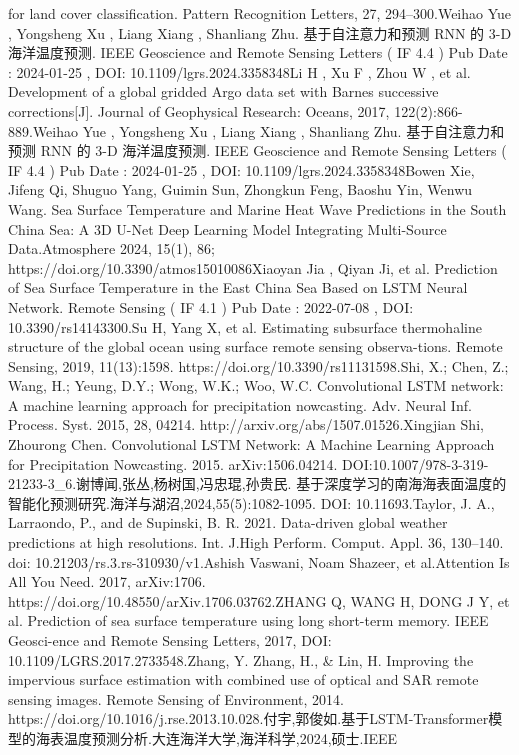 \documentclass[
  12pt,
]{article}
\begin{document}
for land cover classification. Pattern Recognition Letters, 27,
294--300.Weihao Yue , Yongsheng Xu , Liang Xiang , Shanliang Zhu.
基于自注意力和预测 RNN 的 3-D 海洋温度预测. IEEE Geoscience and Remote
Sensing Letters ( IF 4.4 ) Pub Date : 2024-01-25 , DOI:
10.1109/lgrs.2024.3358348Li H , Xu F , Zhou W , et al. Development of a
global gridded Argo data set with Barnes successive corrections{[}J{]}.
Journal of Geophysical Research: Oceans, 2017, 122(2):866-889.Weihao Yue
, Yongsheng Xu , Liang Xiang , Shanliang Zhu. 基于自注意力和预测 RNN 的
3-D 海洋温度预测. IEEE Geoscience and Remote Sensing Letters ( IF 4.4 )
Pub Date : 2024-01-25 , DOI: 10.1109/lgrs.2024.3358348Bowen Xie, Jifeng
Qi, Shuguo Yang, Guimin Sun, Zhongkun Feng, Baoshu Yin, Wenwu Wang. Sea
Surface Temperature and Marine Heat Wave Predictions in the South China
Sea: A 3D U-Net Deep Learning Model Integrating Multi-Source
Data.Atmosphere 2024, 15(1), 86;
https://doi.org/10.3390/atmos15010086Xiaoyan Jia , Qiyan Ji, et al.
Prediction of Sea Surface Temperature in the East China Sea Based on
LSTM Neural Network. Remote Sensing ( IF 4.1 ) Pub Date : 2022-07-08 ,
DOI: 10.3390/rs14143300.Su H, Yang X, et al. Estimating subsurface
thermohaline structure of the global ocean using surface remote sensing
observa-tions. Remote Sensing, 2019, 11(13):1598.
https://doi.org/10.3390/rs11131598.Shi, X.; Chen, Z.; Wang, H.; Yeung,
D.Y.; Wong, W.K.; Woo, W.C. Convolutional LSTM network: A machine
learning approach for precipitation nowcasting. Adv. Neural Inf.
Process. Syst. 2015, 28, 04214. http://arxiv.org/abs/1507.01526.Xingjian
Shi, Zhourong Chen. Convolutional LSTM Network: A Machine Learning
Approach for Precipitation Nowcasting. 2015. arXiv:1506.04214.
DOI:10.1007/978-3-319-21233-3\_6.谢博闻,张丛,杨树国,冯忠琨,孙贵民.
基于深度学习的南海海表面温度的智能化预测研究.海洋与湖沼,2024,55(5):1082-1095.
DOI: 10.11693.Taylor, J. A., Larraondo, P., and de Supinski, B. R. 2021.
Data-driven global weather predictions at high resolutions. Int. J.High
Perform. Comput. Appl. 36, 130--140. doi:
10.21203/rs.3.rs-310930/v1.Ashish Vaswani, Noam Shazeer, et al.Attention
Is All You Need. 2017, arXiv:1706.
https://doi.org/10.48550/arXiv.1706.03762.ZHANG Q, WANG H, DONG J Y, et
al. Prediction of sea surface temperature using long short-term memory.
IEEE Geosci-ence and Remote Sensing Letters, 2017, DOI:
10.1109/LGRS.2017.2733548.Zhang, Y. Zhang, H., \& Lin, H. Improving the
impervious surface estimation with combined use of optical and SAR
remote sensing images. Remote Sensing of Environment, 2014.
https://doi.org/10.1016/j.rse.2013.10.028.付宇,郭俊如.基于LSTM-Transformer模型的海表温度预测分析.大连海洋大学,海洋科学,2024,硕士.IEEE
\end{document}
